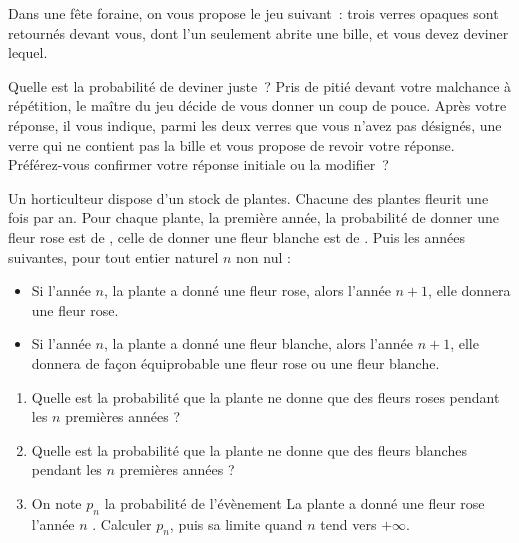 \documentclass{magnolia}
\begin{document}
%
%
%
%
%


Dans une fête foraine, on vous propose le jeu suivant~: trois verres opaques sont
retournés devant vous, dont l'un seulement abrite une bille, et vous devez deviner lequel.
\begin{questions}
\question Quelle est la probabilité de deviner juste~?
\question Pris de pitié devant votre malchance à répétition, le maître du jeu décide 
  de vous donner un coup de pouce. Après votre réponse, il vous indique, parmi les deux
  verres que vous n'avez pas désignés, une verre qui ne contient pas la bille et vous
  propose de revoir votre réponse. Préférez-vous confirmer votre réponse initiale ou
  la modifier~?
\end{questions}

Un horticulteur dispose d'un stock de plantes. Chacune des plantes fleurit une fois par an.
Pour chaque plante, la première année, la probabilité de donner une fleur rose est de ,
celle de donner une fleur blanche est de .  Puis les années suivantes, pour tout entier naturel $n$ non nul :
\begin{itemize}
\item Si l'année $n$, la plante a donné une fleur rose, alors l'année $n+1$, elle donnera
  une fleur rose.
\item Si l'année $n$, la plante a donné une fleur blanche, alors l'année $n+1$, elle
  donnera de façon équiprobable une fleur rose ou une fleur blanche.
\end{itemize}
\begin{enumerate}
\item Quelle est la probabilité que la plante ne donne que des fleurs roses pendant les $n$
premières années ?
\item Quelle est la probabilité que la plante ne donne que des fleurs blanches pendant les $n$
premières années ?
\item On note $p_n$ la probabilité de l'évènement \og
  La plante a donné une fleur rose l'année $n$ \fg.
Calculer $p_n$, puis sa limite quand $n$ tend vers $+\infty$.
\end{enumerate}
\end{document}
